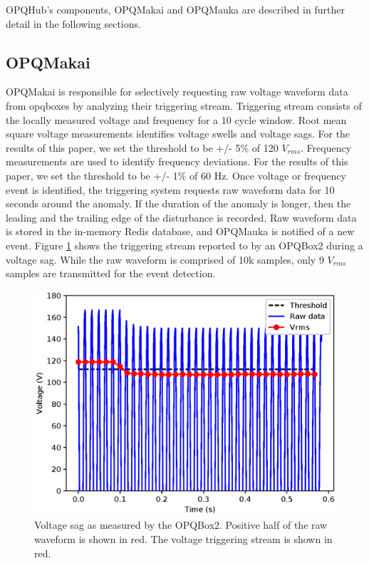 \documentclass[a4paper, conference]{IEEEtran}
\begin{document}
OPQHub's components, OPQMakai and OPQMauka are described in further detail in the following sections.

\subsection{OPQMakai}

OPQMakai is responsible for selectively requesting raw voltage waveform data from opqboxes by analyzing their triggering stream. Triggering stream consists of the locally measured voltage and frequency for a 10 cycle window. Root mean square voltage measurements identifies voltage swells and voltage sags. For the results of this paper, we set the threshold to be +/- 5\% of 120 $V_{rms}$. 
Frequency measurements are used to identify frequency deviations. For the results of this paper, we set the threshold to be +/- 1\% of 60 Hz. Once voltage or frequency event is identified, the triggering system requests raw waveform data for 10 seconds around the anomaly. If the duration of the anomaly is longer, then the leading and the trailing edge of the disturbance is recorded. Raw waveform data is stored in the in-memory Redis database, and OPQMauka is notified of a new event.
Figure \ref{fig:event1} shows the triggering stream reported to by an OPQBox2 during a voltage sag. While the raw waveform is comprised of 10k samples, only 9 $V_{rms}$ samples are transmitted for the event detection.

\begin{figure}[h]
    \centering
    \includegraphics[width=0.9\columnwidth]{img/test.eps}
    \caption{Voltage sag as measured by the OPQBox2. Positive half of the raw waveform is shown in red. The voltage triggering stream is shown in red.}
    \label{fig:event1}
\end{figure}
\end{document}
